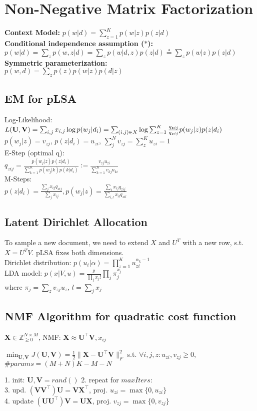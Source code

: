 \section{Non-Negative Matrix Factorization}
\textbf{Context Model:} $p(w | d) = \sum_{z=1}^K p(w | z) p(z | d)$\\
\textbf{Conditional independence assumption ($*$):}\\
$p(w|d) = \sum_z p(w,z|d) = \sum_z p(w|d,z)p(z|d) \stackrel{*}{=} \sum_z p(w|z)p(z|d)$\\
\textbf{Symmetric parameterization:}\\
$p(w, d) = \sum_z p(z)p(w | z) p(d | z)$

\subsection*{EM for pLSA}
Log-Likelihood: $L(\mathbf{U}, \mathbf{V}) = \sum_{i,j} x_{i,j}\log p(w_j|d_i) \\
= \sum_{(i,j) \in X} \log \sum_{z=1}^K \frac{q_{zij}}{q_{zij}}p(w_j|z)p(z|d_i)$ \\ 
$ p(w_j|z) = v_{zj}$, $p(z|d_i) = u_{zi}$, $\sum_j^N v_{zj} = \sum_z^K u_{zi} = 1$\\
E-Step (optimal q):\\
$q_{zij} = \frac{p(w_j|z)p(z|d_i)}{\sum_{k=1}^K p(w_j|k)p(k|d_i)} := \frac{v_{zj}u_{zi}}{\sum_{k=1}^K v_{kj}u_{ki}}$\\
M-Steps:\\
$p(z|d_i) = \frac{\sum_j x_{ij}q_{zij}}{\sum_j x_{ij}}, p(w_j|z) = \frac{\sum_i x_{ij}q_{zij}}{\sum_{i,l}x_{il}q_{zil}}$\\

\subsection*{Latent Dirichlet Allocation}
To sample a new document, we need to extend $X$ and $U^T$ with a new row, s.t. $X=U^T V$. pLSA fixes both dimensions.\\
Dirichlet distribution: $p(u_i|\alpha) = \prod_{z=1}^K u_{zi}^{\alpha_k-1}$\\
LDA model: $p(x|V,u) = \frac{l!}{\prod_j x_j!}\prod_j \pi_j^{x_j}$\\
where $\pi_j=\sum_z v_{zj} u_z$, $l=\sum_j x_j$

\subsection*{NMF Algorithm for quadratic cost function}
$\mathbf{X} \in \mathbb{Z}^{N \times M}_{\geq 0}$, NMF: $\mathbf{X} \approx \mathbf{U^\top V}, x_{ij}$

$\min_{\mathbf{U}, \mathbf{V}} J(\mathbf{U}, \mathbf{V}) = \frac{1}{2} \|\mathbf{X} - \mathbf{U}^\top\mathbf{V}\|_F^2$
s.t. $\forall i,j,z:u_{zi},v_{zj} \geq 0 $, $\# params = (M+N)K-M-N$


1. init: $\mathbf{U}, \mathbf{V} = rand()$ 2. repeat for $\mathit{maxIters}$:\\
3. upd. $(\mathbf{VV}^\top)\mathbf{U} = \mathbf{VX}^\top$, proj. $u_{zi} = \max \{ 0, u_{zi} \}$\\
4. update $(\mathbf{UU}^\top)\mathbf{V} = \mathbf{UX}$, proj. $v_{zj} = \max \{ 0, v_{zj} \}$
